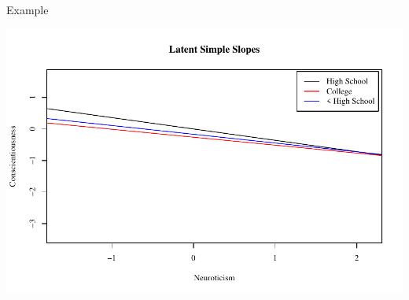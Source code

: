 \documentclass{beamer}
\begin{document}
\begin{frame}[allowframebreaks]{Example}
  


\pagebreak



\pagebreak


\includegraphics{sweaveFiles/-043}

\end{frame}
\end{document}
